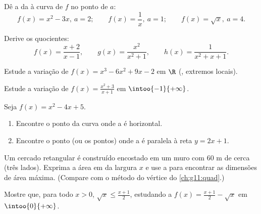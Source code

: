 \begin{exercise}[$\star$]\label{exo:g11:deriv:3}
Dê a  da  à curva de $f$ no ponto de  $a$:
\[
f(x) = x^2 - 3x, \ a = 2; \qquad
f(x) = \frac1x, \ a = 1; \qquad
f(x) = \sqrt x, \ a = 4 .
\]
\end{exercise}

\begin{exercise}[$\star$]\label{exo:g11:deriv:4}
Derive os quocientes:
\[
f(x) = \frac{x+2}{x-1}, \qquad
g(x) = \frac{x^2}{x^2+1}, \qquad
h(x) = \frac{1}{x^2 + x + 1} .
\]
\end{exercise}

\begin{exercise}[$\star\star$]\label{exo:g11:deriv:5}
Estude a variação de $f(x) = x^3 - 6x^2 + 9x - 2$ em $\R$ (, extremos locais).
\end{exercise}

\begin{exercise}[$\star\star$]\label{exo:g11:deriv:6}
Estude a variação de $f(x) = \frac{x^2 + 3}{x + 1}$ em
$\intoo{-1}{+\infty}$.
\end{exercise}

\begin{exercise}[$\star\star$]\label{exo:g11:deriv:7}
Seja $f(x) = x^2 - 4x + 5$.
\begin{enumerate}
  \item Encontre o ponto da curva onde a  é horizontal.
  \item Encontre o ponto (ou os pontos) onde a  é paralela à reta
        $y = 2x + 1$.
\end{enumerate}
\end{exercise}

\begin{exercise}[$\star\star$]\label{exo:g11:deriv:8}
Um cercado retangular é construído encostado em um muro com $60$ m de
cerca (três lados). Exprima a área em  da largura $x$ e use a
 para encontrar as dimensões de área máxima. (Compare com o
método do vértice do \cref{ch:g11:quad}.)
\end{exercise}

\begin{exercise}[$\star\star$]\label{exo:g11:deriv:9}
Mostre que, para todo $x > 0$, $\sqrt{x} \leq \frac{x + 1}{2}$,
estudando a  $f(x) = \frac{x+1}{2} - \sqrt x$ em
$\intoo{0}{+\infty}$.
\end{exercise}

